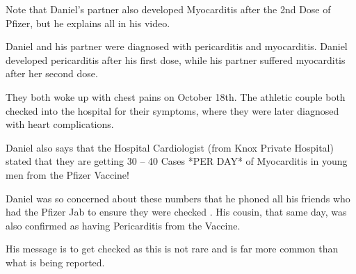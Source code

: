 Note that Daniel’s partner also developed Myocarditis after the 2nd Dose of
Pfizer, but he explains all in his video.

Daniel and his partner were diagnosed with pericarditis and myocarditis. Daniel
developed pericarditis after his first dose, while his partner suffered
myocarditis after her second dose.

They both woke up with chest pains on October 18th. The athletic couple both
checked into the hospital for their symptoms, where they were later diagnosed
with heart complications.

Daniel also says that the Hospital Cardiologist (from Knox Private Hospital)
stated that they are getting 30 – 40 Cases *PER DAY* of Myocarditis in young men
from the Pfizer Vaccine!

Daniel was so concerned about these numbers that he phoned all his friends who
had the Pfizer Jab to ensure they were checked . His cousin, that same day, was
also confirmed as having Pericarditis from the Vaccine.

His message is to get checked as this is not rare and is far more common than
what is being reported.

